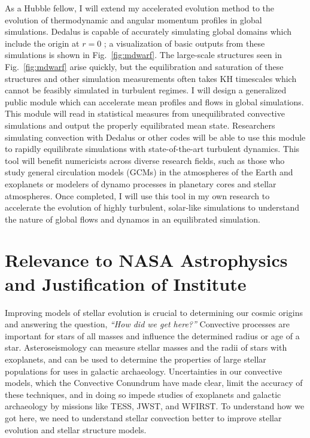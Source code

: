 \documentclass[preprint, hmargin=1in, vmargin=1in]{aastex62}
\begin{document}
As a Hubble fellow, I will extend my accelerated evolution method to the evolution of thermodynamic and angular momentum profiles in global simulations.
Dedalus is capable of accurately simulating global domains which include the origin at $r = 0$ \citep{lecoanet&all2019}; a visualization of basic outputs from these simulations is shown in Fig.~\ref{fig:mdwarf}.
The large-scale structures seen in Fig.~\ref{fig:mdwarf} arise quickly, but the equilibration and saturation of these structures and other simulation measurements often takes KH timescales which cannot be feasibly simulated in turbulent regimes.
I will design a generalized public module which can accelerate mean profiles and flows in global simulations.
This module will read in statistical measures from unequilibrated convective simulations and output the properly equilibrated mean state.
Researchers simulating convection with Dedalus or other codes will be able to use this module to rapidly equilibrate simulations with state-of-the-art turbulent dynamics.
This tool will benefit numericists across diverse research fields, such as those who study general circulation models (GCMs) in the atmospheres of the Earth and exoplanets or modelers of dynamo processes in planetary cores and stellar atmospheres.
Once completed, I will use this tool in my own research to accelerate the evolution of highly turbulent, solar-like simulations to understand the nature of global flows and dynamos in an equilibrated simulation.


\section*{Relevance to NASA Astrophysics and Justification of Institute}
Improving models of stellar evolution is crucial to determining our cosmic origins and answering the question, \emph{``How did we get here?''}
Convective processes are important for stars of all masses and influence the determined radius or age of a star.
Asteroseismology can measure stellar masses and the radii of stars with exoplanets, and can be used to determine the properties of large stellar populations for uses in galactic archaeology.
Uncertainties in our convective models, which the Convective Conundrum have made clear, limit the accuracy of these techniques, and in doing so impede studies of exoplanets and galactic archaeology by missions like TESS, JWST, and WFIRST.
To understand how we got here, we need to understand stellar convection better to improve stellar evolution and stellar structure models.
\end{document}
